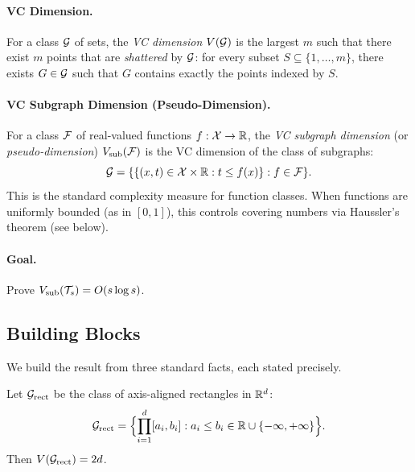 \documentclass[12pt]{article}
\begin{document}
\paragraph{VC Dimension.}
For a class $\mathcal{G}$ of sets, the \emph{VC dimension} $V(\mathcal{G})$ is the largest $m$ such that there exist $m$ points that are \emph{shattered} by $\mathcal{G}$: for every subset $S \subseteq \{1,\ldots,m\}$, there exists $G \in \mathcal{G}$ such that $G$ contains exactly the points indexed by $S$.

\paragraph{VC Subgraph Dimension (Pseudo-Dimension).}
For a class $\mathcal{F}$ of real-valued functions $f: \mathcal{X} \to \mathbb{R}$, the \emph{VC subgraph dimension} (or \emph{pseudo-dimension}) $V_{\text{sub}}(\mathcal{F})$ is the VC dimension of the class of subgraphs:
\[
\mathcal{G} = \{ \{ (x,t) \in \mathcal{X} \times \mathbb{R} : t \le f(x) \} : f \in \mathcal{F} \}.
\]
This is the standard complexity measure for function classes. When functions are uniformly bounded (as in $[0,1]$), this controls covering numbers via Haussler's theorem (see below).

\paragraph{Goal.}
Prove $V_{\text{sub}}(\mathcal{T}_s) = O(s \log s)$.

\subsection{Building Blocks}

We build the result from three standard facts, each stated precisely.

\begin{lemma}
\label{lem:vc-rect-app}
Let $\mathcal{G}_{\text{rect}}$ be the class of axis-aligned rectangles in $\mathbb{R}^d$:
\[
\mathcal{G}_{\text{rect}} = \Bigl\{ \prod_{i=1}^d [a_i, b_i] : a_i \le b_i \in \mathbb{R} \cup \{-\infty, +\infty\} \Bigr\}.
\]
Then $V(\mathcal{G}_{\text{rect}}) = 2d$.
\end{lemma}
\end{document}
